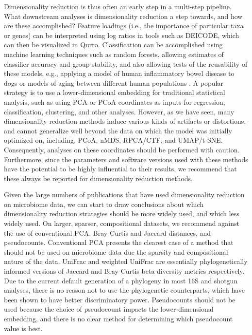 Dimensionality reduction is thus often an early step in a multi-step pipeline. What downstream analyses is dimensionality reduction a step towards, and how are these accomplished? Feature loadings (i.e., the importance of particular taxa or genes) can be interpreted using log ratios in tools such as DEICODE, which can then be visualized in Qurro. Classification can be accomplished using machine learning techniques such as random forests, allowing estimates of classifier accuracy and group stability, and also allowing tests of the reusability of these models, e.g., applying a model of human inflammatory bowel disease to dogs \cite{Vazquez-Baeza2016-sq} or models of aging between different human populations \cite{Huang2020-iw}. A popular strategy is to use a lower-dimensional embedding for traditional statistical analysis, such as using PCA or PCoA coordinates as inputs for regression, classification, clustering, and other analyses. However, as we have seen, many dimensionality reduction methods induce various kinds of artifacts or distortions, and cannot generalize well beyond the data on which the model was initially optimized on, including, PCoA, nMDS, RPCA/CTF, and UMAP/t-SNE. Consequently, analyses on these coordinates should be performed with caution. Furthermore, since the parameters and software versions used with these methods have the potential to be highly influential to their results, we recommend that these always be reported for dimensionality reduction methods.

Given the large numbers of publications that have used dimensionality reduction on microbiome data, we can start to draw conclusions about which dimensionality reduction strategies should be more widely used, and which less widely used. On larger, sparser, compositional datasets, we recommend against the use of conventional PCA, Bray-Curtis and Jaccard distances, and pseudocounts. Conventional PCA presents the clearest case of a method that should not be used on microbiome data due the sparsity and compositional nature of the data. UniFrac and weighted UniFrac are essentially phylogenetically informed versions of Jaccard and Bray-Curtis beta-diversity metrics respectively. Due to the current default generation of a phylogeny in most 16S and shotgun analyses, there is no reason not to use the phylogenetic counterparts, which have been shown to have better discriminatory power. Pseudocounts should not be used because the choice of pseudocount impacts the lower-dimensional embedding, and there is no clear method for determining which pseudocount value is best.

